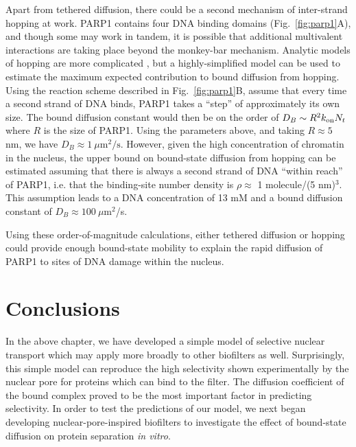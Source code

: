 Apart from tethered diffusion, there could be a second mechanism of inter-strand hopping at work.  PARP1 contains four DNA binding domains (Fig.~\ref{fig:parp1}A), and though some may work in tandem, it is possible that additional multivalent interactions are taking place beyond the monkey-bar mechanism.  Analytic models of hopping are more complicated \cite{yang18}, but a highly-simplified model can be used to estimate the maximum expected contribution to bound diffusion from hopping.  Using the reaction scheme described in Fig.~\ref{fig:parp1}B, assume that every time a second strand of DNA binds, PARP1 takes a ``step'' of approximately its own size.  The bound diffusion constant would then be on the order of $D_B \sim R^2 k_{\rm on} N_t$ where $R$ is the size of PARP1.  Using the parameters above, and taking $R \approx 5$ nm, we have $D_B \approx 1\ \mu\mathrm{m}^2/\mathrm{s}$.  However, given the high concentration of chromatin in the nucleus, the upper bound on bound-state diffusion from hopping can be estimated assuming that there is always a second strand of DNA ``within reach'' of PARP1, i.e. that the binding-site number density is $\rho \approx $ 1 molecule/(5 nm)$^3$.  This assumption leads to a DNA concentration of 13 mM and a bound diffusion constant of $D_B \approx  100\ \mu$m$^2$/s.

Using these order-of-magnitude calculations, either tethered diffusion or hopping could provide enough bound-state mobility to explain the rapid diffusion of PARP1 to sites of DNA damage within the nucleus.

\section{Conclusions}

In the above chapter, we have developed a simple model of selective nuclear transport which may apply more broadly to other biofilters as well.  Surprisingly, this simple model can reproduce the high selectivity shown experimentally by the nuclear pore for proteins which can bind to the filter.  The diffusion coefficient of the bound complex proved to be the most important factor in predicting selectivity.  In order to test the predictions of our model, we next began developing nuclear-pore-inspired biofilters to investigate the effect of bound-state diffusion on protein separation \textit{in vitro}.

